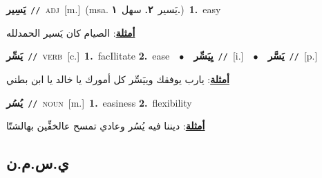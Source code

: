 \documentclass[10pt,a4paper,twoside]{article} %
\begin{document}
\begin{multicols}{2}
{{{{{{\setlength\topsep{0pt}\textbf{\foreignlanguage{arabic}{يَسِير}}\ {\color{gray}\texttt{//}\color{black}}\ \textsc{adj}\ [m.]\ \color{gray}(msa. \foreignlanguage{arabic}{يَسير}~\foreignlanguage{arabic}{\textbf{٢.}}  \foreignlanguage{arabic}{سهل}~\foreignlanguage{arabic}{\textbf{١.}})\color{black}\ \textbf{1.}~easy\  \begin{flushright}\color{gray}\foreignlanguage{arabic}{\textbf{\underline{\foreignlanguage{arabic}{أمثلة}}}: الصيام كان يَسير الحمدلله}\end{flushright}\color{black}} \vspace{2mm}

{\setlength\topsep{0pt}\textbf{\foreignlanguage{arabic}{يَسِّر}}\ {\color{gray}\texttt{//}\color{black}}\ \textsc{verb}\ [c.]\ \textbf{1.}~facIlitate  \textbf{2.}~ease\ \ $\bullet$\ \ \setlength\topsep{0pt}\textbf{\foreignlanguage{arabic}{يِيَسِّر}}\ {\color{gray}\texttt{//}\color{black}}\ [i.]\ \ $\bullet$\ \ \setlength\topsep{0pt}\textbf{\foreignlanguage{arabic}{يَسَّر}}\ {\color{gray}\texttt{//}\color{black}}\ [p.]\  \begin{flushright}\color{gray}\foreignlanguage{arabic}{\textbf{\underline{\foreignlanguage{arabic}{أمثلة}}}: يارب يوفقك وييَسِّر كل أمورك يا خالد يا ابن بطني}\end{flushright}\color{black}} \vspace{2mm}

{\setlength\topsep{0pt}\textbf{\foreignlanguage{arabic}{يُسُر}}\ {\color{gray}\texttt{//}\color{black}}\ \textsc{noun}\ [m.]\ \textbf{1.}~easiness  \textbf{2.}~flexibility\  \begin{flushright}\color{gray}\foreignlanguage{arabic}{\textbf{\underline{\foreignlanguage{arabic}{أمثلة}}}: ديننا فيه يُسُر وعادي تمسح عالخفِّين بهالشتّا}\end{flushright}\color{black}} \vspace{2mm}

\vspace{-3mm}
\subsection*{\color{blue}\foreignlanguage{arabic}{ي.س.م.ن}\color{blue}{ (ntws)}} 

}}}}}
\end{multicols}
\end{document}
